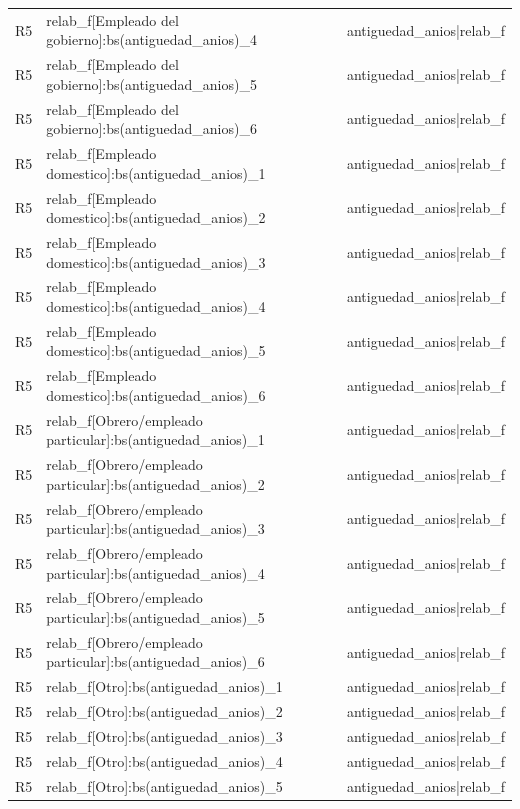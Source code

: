 \begin{longtable}{lll}
R5 & relab\_f[Empleado del gobierno]:bs(antiguedad\_anios)\_4 & antiguedad\_anios|relab\_f \\
R5 & relab\_f[Empleado del gobierno]:bs(antiguedad\_anios)\_5 & antiguedad\_anios|relab\_f \\
R5 & relab\_f[Empleado del gobierno]:bs(antiguedad\_anios)\_6 & antiguedad\_anios|relab\_f \\
R5 & relab\_f[Empleado domestico]:bs(antiguedad\_anios)\_1 & antiguedad\_anios|relab\_f \\
R5 & relab\_f[Empleado domestico]:bs(antiguedad\_anios)\_2 & antiguedad\_anios|relab\_f \\
R5 & relab\_f[Empleado domestico]:bs(antiguedad\_anios)\_3 & antiguedad\_anios|relab\_f \\
R5 & relab\_f[Empleado domestico]:bs(antiguedad\_anios)\_4 & antiguedad\_anios|relab\_f \\
R5 & relab\_f[Empleado domestico]:bs(antiguedad\_anios)\_5 & antiguedad\_anios|relab\_f \\
R5 & relab\_f[Empleado domestico]:bs(antiguedad\_anios)\_6 & antiguedad\_anios|relab\_f \\
R5 & relab\_f[Obrero/empleado particular]:bs(antiguedad\_anios)\_1 & antiguedad\_anios|relab\_f \\
R5 & relab\_f[Obrero/empleado particular]:bs(antiguedad\_anios)\_2 & antiguedad\_anios|relab\_f \\
R5 & relab\_f[Obrero/empleado particular]:bs(antiguedad\_anios)\_3 & antiguedad\_anios|relab\_f \\
R5 & relab\_f[Obrero/empleado particular]:bs(antiguedad\_anios)\_4 & antiguedad\_anios|relab\_f \\
R5 & relab\_f[Obrero/empleado particular]:bs(antiguedad\_anios)\_5 & antiguedad\_anios|relab\_f \\
R5 & relab\_f[Obrero/empleado particular]:bs(antiguedad\_anios)\_6 & antiguedad\_anios|relab\_f \\
R5 & relab\_f[Otro]:bs(antiguedad\_anios)\_1 & antiguedad\_anios|relab\_f \\
R5 & relab\_f[Otro]:bs(antiguedad\_anios)\_2 & antiguedad\_anios|relab\_f \\
R5 & relab\_f[Otro]:bs(antiguedad\_anios)\_3 & antiguedad\_anios|relab\_f \\
R5 & relab\_f[Otro]:bs(antiguedad\_anios)\_4 & antiguedad\_anios|relab\_f \\
R5 & relab\_f[Otro]:bs(antiguedad\_anios)\_5 & antiguedad\_anios|relab\_f \\

\end{longtable}
